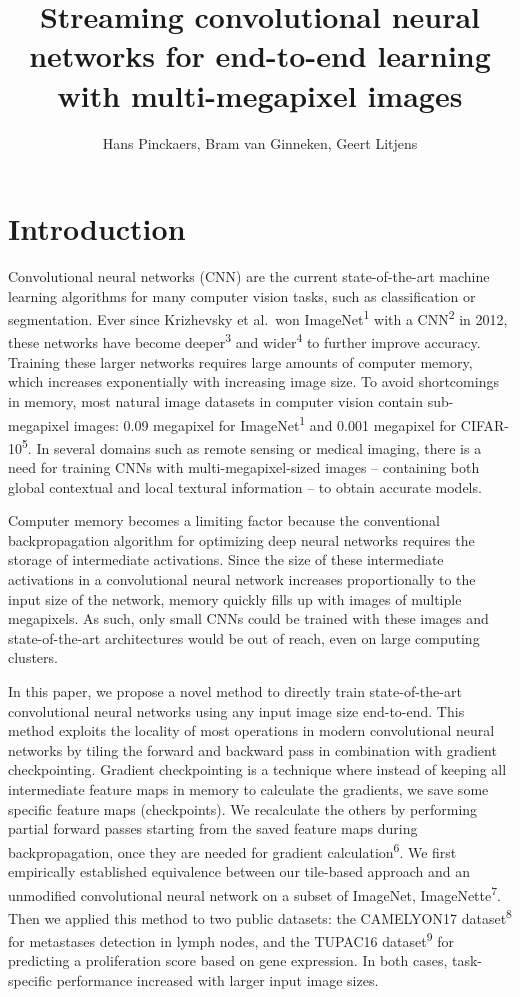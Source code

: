 \documentclass[
  12pt,
  a5,margin=2cmpaper,
]{article}
\title{Streaming convolutional neural networks for end-to-end learning
with multi-megapixel images}
\author{Hans Pinckaers, Bram van Ginneken, Geert Litjens}
\date{}
\begin{document}
\maketitle

\hypertarget{introduction}{%
\section{Introduction}\label{introduction}}

Convolutional neural networks (CNN) are the current state-of-the-art
machine learning algorithms for many computer vision tasks, such as
classification or segmentation. Ever since Krizhevsky et al.~won
ImageNet\textsuperscript{1} with a CNN\textsuperscript{2} in 2012, these
networks have become deeper\textsuperscript{3} and
wider\textsuperscript{4} to further improve accuracy. Training these
larger networks requires large amounts of computer memory, which
increases exponentially with increasing image size. To avoid
shortcomings in memory, most natural image datasets in computer vision
contain sub-megapixel images: 0.09 megapixel for
ImageNet\textsuperscript{1} and 0.001 megapixel for
CIFAR-10\textsuperscript{5}. In several domains such as remote sensing
or medical imaging, there is a need for training CNNs with
multi-megapixel-sized images -- containing both global contextual and
local textural information -- to obtain accurate models.

Computer memory becomes a limiting factor because the conventional
backpropagation algorithm for optimizing deep neural networks requires
the storage of intermediate activations. Since the size of these
intermediate activations in a convolutional neural network increases
proportionally to the input size of the network, memory quickly fills up
with images of multiple megapixels. As such, only small CNNs could be
trained with these images and state-of-the-art architectures would be
out of reach, even on large computing clusters.

In this paper, we propose a novel method to directly train
state-of-the-art convolutional neural networks using any input image
size end-to-end. This method exploits the locality of most operations in
modern convolutional neural networks by tiling the forward and backward
pass in combination with gradient checkpointing. Gradient checkpointing
is a technique where instead of keeping all intermediate feature maps in
memory to calculate the gradients, we save some specific feature maps
(checkpoints). We recalculate the others by performing partial forward
passes starting from the saved feature maps during backpropagation, once
they are needed for gradient calculation\textsuperscript{6}. We first
empirically established equivalence between our tile-based approach and
an unmodified convolutional neural network on a subset of ImageNet,
ImageNette\textsuperscript{7}. Then we applied this method to two public
datasets: the CAMELYON17 dataset\textsuperscript{8} for metastases
detection in lymph nodes, and the TUPAC16 dataset\textsuperscript{9} for
predicting a proliferation score based on gene expression. In both
cases, task-specific performance increased with larger input image
sizes.
\end{document}
